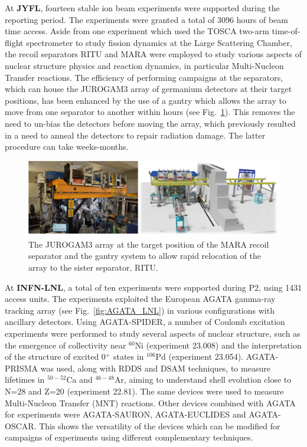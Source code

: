 At \textbf{JYFL}, fourteen stable ion beam experiments were supported during the reporting period. The experiments were granted a total of 3096 hours of beam time access. Aside from one experiment which used the TOSCA two-arm time-of-flight spectrometer to study fission dynamics at the Large Scattering Chamber, the recoil separators RITU and MARA 
were employed
to study various aspects of nuclear structure physics and reaction dynamics, in particular Multi-Nucleon Transfer reactions. The efficiency of performing campaigns at the separators, which can house the JUROGAM3 array of germanium detectors at their target positions, has been enhanced by the use of a gantry which allows the array to move from one separator to another within hours (see Fig.~\ref{fig:Jurogam3}). This removes the need to un-bias the detectors before moving the array, which previously resulted in a need to anneal the detectors to repair radiation damage. The latter procedure can take weeks-months. 

\begin{figure}[!h]
    \centering
    \includegraphics[width=1.0\linewidth]{graphics/Jurogam3.png}
    \caption{The JUROGAM3 array at the target position of the MARA recoil separator and the gantry system to allow rapid relocation of the array to the sister separator, RITU.}
    \label{fig:Jurogam3}
\end{figure}

At \textbf{INFN-LNL}, a total of ten experiments were supported during P2,  using 1431 access units. The experiments exploited the European AGATA gamma-ray tracking array (see Fig.~\ref{fig:AGATA_LNL}) in various configurations with ancillary detectors. Using AGATA-SPIDER, a number of Coulomb excitation experiments were performed to study several aspects of nuclear structure, such as the emergence of collectivity near $^{60}$Ni (experiment 23.008) and the interpretation of the structure of excited 0$^+$ states in $^{106}$Pd (experiment 23.054). AGATA-PRISMA was used, along with RDDS and DSAM techniques, to measure lifetimes in $^{50-52}$Ca and $^{46-48}$Ar, aiming to understand shell evolution close to N=28 and Z=20 (experiment 22.81). The same devices were used to measure Multi-Nucleon Transfer (MNT) reactions. 
 Other devices combined with AGATA for experiments were AGATA-SAURON, AGATA-EUCLIDES and AGATA-OSCAR. This shows the versatility of the devices which can be modified for campaigns of experiments using different complementary techniques.

